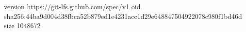 version https://git-lfs.github.com/spec/v1
oid sha256:44ba9d004d38fbca52b879ed1e4231acc1d29e648847504922078c980f1bd46d
size 1048672
